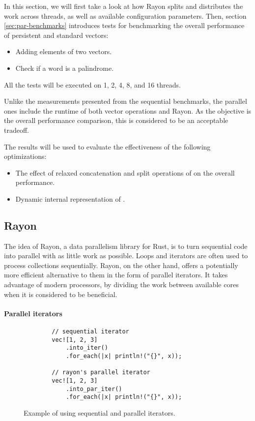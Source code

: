 In this section, we will first take a look at how Rayon splits and distributes the work across threads, as well as available configuration parameters. Then, section \ref{sec:par-benchmarks} introduces tests for benchmarking the overall performance of persistent and standard vectors:

\begin{itemize}    
    \item Adding elements of two vectors.    
    \item Check if a word is a palindrome.         
\end{itemize}

All the tests will be executed on 1, 2, 4, 8, and 16 threads. 

Unlike the measurements presented from the sequential benchmarks, the parallel ones include the runtime of both vector operations and Rayon. As the objective is the overall performance comparison, this is considered to be an acceptable tradeoff. 

The results will be used to evaluate the effectiveness of the following optimizations:
\begin{itemize}
    \item The effect of relaxed concatenation and split operations of \rrbvec{} on the overall performance.
    \item Dynamic internal representation of \pvec{}. 
\end{itemize}

\subsection{Rayon}
The idea of Rayon, a data parallelism library for Rust, is to turn sequential code into parallel with as little work as possible. Loops and iterators are often used to process collections sequentially. Rayon, on the other hand, offers a potentially more efficient alternative to them in the form of parallel iterators. It takes advantage of modern processors, by dividing the work between available cores when it is considered to be beneficial. 

\paragraph*{Parallel iterators}
\begin{figure}[!htbp] 
    \centering

    \begin{verbatim}
        // sequential iterator
        vec![1, 2, 3]
            .into_iter()
            .for_each(|x| println!("{}", x));

        // rayon's parallel iterator
        vec![1, 2, 3]
            .into_par_iter()
            .for_each(|x| println!("{}", x));
    \end{verbatim}

    \caption{Example of using sequential and parallel iterators.}
    \label{fig:par-iter-example}
\end{figure}

